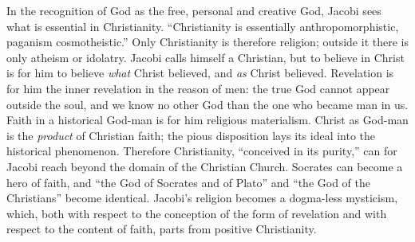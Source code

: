 In the recognition of God as the free, personal and creative God,
Jacobi sees what is essential in Christianity. ``Christianity is
essentially anthropomorphistic, paganism cosmotheistic.'' Only
Christianity is therefore religion; outside it there is only atheism or
idolatry. Jacobi calls himself a Christian, but to believe in Christ is
for him to believe \emph{what} Christ believed, and \emph{as}
Christ believed. Revelation is for him the inner revelation in the
reason of men: the true God cannot appear outside the soul, and we know
no other God than the one who became man in us. Faith in a historical
God-man is for him
religious materialism. Christ as God-man is the \emph{product} of
Christian faith; the pious disposition lays its ideal into the
historical phenomenon. Therefore Christianity, ``conceived in its
purity,'' can for Jacobi reach beyond the domain of the Christian
Church. Socrates can become a hero of faith, and ``the God of Socrates
and of Plato'' and ``the God of the Christians'' become identical.
Jacobi's religion becomes a dogma-less mysticism, which, both with
respect to the conception of the form of revelation and with respect to
the content of faith, parts from positive Christianity.

\divrule

